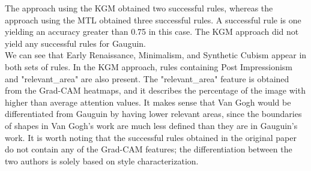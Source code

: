 \documentclass{article}
\begin{document}
\begin{table}[h]
\centering
{}
\caption{Rules to differentiate Van Gogh and Gauguin (MTL-FCM) }
\label{tab:my-table2}
\end{table}

The approach using the KGM obtained two successful rules, whereas the approach using the MTL obtained three successful rules. A successful rule is one yielding an accuracy greater than 0.75 in this case. The KGM approach did not yield any successful rules for Gauguin.\\

We can see that Early Renaissance, Minimalism, and Synthetic Cubism appear in both sets of rules. In the KGM approach, rules containing Post Impressionism and "relevant\_area" are also present. The "relevant\_area" feature is obtained from the Grad-CAM heatmaps, and it describes the percentage of the image with higher than average attention values. It makes sense that Van Gogh would be differentiated from Gauguin by having lower relevant areas, since the boundaries of shapes in Van Gogh's work are much less defined than they are in Gauguin's work. It is worth noting that the successful rules obtained in the original paper do not contain any of the Grad-CAM features; the differentiation between the two authors is solely based on style characterization. 
\end{document}
